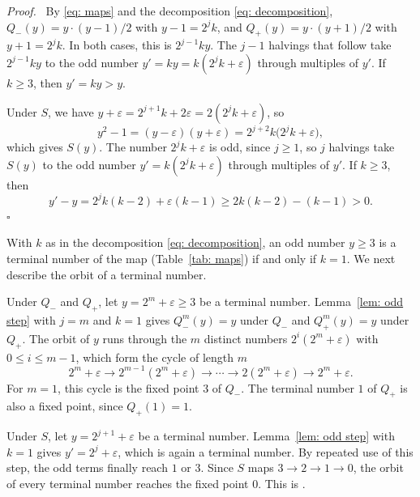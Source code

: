 \documentclass{article}
\newenvironment{proof}[1][Proof]{\par\medskip\noindent\textit{#1.}\ }{\hfill$\square$\par\medskip}
\newcommand{\Le}{\leqslant}
\newcommand{\Ge}{\geqslant}
\begin{document}
\begin{proof}
    By \eqref{eq: maps} and the decomposition \eqref{eq: decomposition}, $Q_-(y) = y \cdot (y - 1)/2$ with $y - 1 = 2^j k$, and $Q_+(y) = y \cdot (y + 1)/2$ with $y + 1 = 2^j k$. In both cases, this is $2^{j-1} k y$. The $j - 1$ halvings that follow take $2^{j-1} k y$ to the odd number $y' = k y = k (2^j k + \varepsilon)$ through multiples of $y'$. If $k \Ge 3$, then $y' = k y > y$.

    Under $S$, we have $y + \varepsilon = 2^{j+1} k + 2 \varepsilon = 2 (2^j k + \varepsilon)$, so
    \begin{equation*}
        y^2 - 1 = (y - \varepsilon)(y + \varepsilon) = 2^{j+2} k \bigl( 2^j k + \varepsilon \bigr) ,
    \end{equation*}
    which gives $S(y)$. The number $2^j k + \varepsilon$ is odd, since $j \Ge 1$, so $j$ halvings take $S(y)$ to the odd number $y' = k (2^j k + \varepsilon)$ through multiples of $y'$. If $k \Ge 3$, then
    \begin{equation*}
        y' - y = 2^j k (k - 2) + \varepsilon (k - 1) \Ge 2k (k - 2) - (k - 1) > 0 .
    \end{equation*}
\end{proof}

With $k$ as in the decomposition \eqref{eq: decomposition}, an odd number $y \Ge 3$ is a terminal number of the map (Table~\ref{tab: maps}) if and only if $k = 1$. We next describe the orbit of a terminal number.

Under $Q_-$ and $Q_+$, let $y = 2^m + \varepsilon \Ge 3$ be a terminal number. Lemma~\ref{lem: odd step} with $j = m$ and $k = 1$ gives $Q_-^m(y) = y$ under $Q_-$ and $Q_+^m(y) = y$ under $Q_+$. The orbit of $y$ runs through the $m$ distinct numbers $2^i (2^m + \varepsilon)$ with $0 \Le i \Le m - 1$, which form the cycle of length $m$
\begin{equation}
    2^m + \varepsilon \to 2^{m-1} (2^m + \varepsilon) \to \cdots \to 2 (2^m + \varepsilon) \to 2^m + \varepsilon .
    \label{eq: cycle}
\end{equation}
For $m = 1$, this cycle is the fixed point $3$ of $Q_-$. The terminal number $1$ of $Q_+$ is also a fixed point, since $Q_+(1) = 1$.

Under $S$, let $y = 2^{j+1} + \varepsilon$ be a terminal number. Lemma~\ref{lem: odd step} with $k = 1$ gives $y' = 2^j + \varepsilon$, which is again a terminal number. By repeated use of this step, the odd terms finally reach $1$ or $3$. Since $S$ maps $3 \to 2 \to 1 \to 0$, the orbit of every terminal number reaches the fixed point $0$. This is \citep[Lemma~6]{sedaghat2020bounded}.
\end{document}
